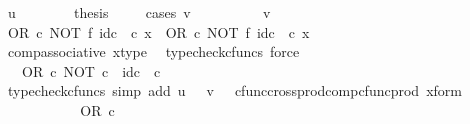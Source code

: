 \begin{isabellebody}
\ {\isachardoublequoteopen}u\ {\isacharequal}{\kern0pt}\ {\isasymt}{\isachardoublequoteclose}\isanewline
\ \ \ \ \isamarkupfalse%
\ {\isacharquery}{\kern0pt}thesis\isanewline
\ \ \ \ \isamarkupfalse%
{\isacharparenleft}{\kern0pt}cases\ {\isachardoublequoteopen}v\ {\isacharequal}{\kern0pt}\ {\isasymt}{\isachardoublequoteclose}{\isacharparenright}{\kern0pt}\isanewline
\ \ \ \ \ \ \isamarkupfalse%
\ {\isachardoublequoteopen}v\ {\isacharequal}{\kern0pt}\ {\isasymt}{\isachardoublequoteclose}\isanewline
\ \ \ \ \ \ \isamarkupfalse%
\ {\isachardoublequoteopen}{\isacharparenleft}{\kern0pt}OR\ {\isasymcirc}\isactrlsub c\ NOT\ {\isasymtimes}\isactrlsub f\ id\isactrlsub c\ {\isasymOmega}{\isacharparenright}{\kern0pt}\ {\isasymcirc}\isactrlsub c\ x\ {\isacharequal}{\kern0pt}\ OR\ {\isasymcirc}\isactrlsub c\ {\isacharparenleft}{\kern0pt}NOT\ {\isasymtimes}\isactrlsub f\ id\isactrlsub c\ {\isasymOmega}{\isacharparenright}{\kern0pt}\ {\isasymcirc}\isactrlsub c\ x{\isachardoublequoteclose}\isanewline
\ \ \ \ \ \ \ \ \isamarkupfalse%
\ comp{\isacharunderscore}{\kern0pt}associative{}\ x{\isacharunderscore}{\kern0pt}type\ \isamarkupfalse%
\ {\isacharparenleft}{\kern0pt}typecheck{\isacharunderscore}{\kern0pt}cfuncs{\isacharcomma}{\kern0pt}\ force{\isacharparenright}{\kern0pt}\isanewline
\ \ \ \ \ \ \isamarkupfalse%
\ \isamarkupfalse%
\ {\isachardoublequoteopen}{\isachardot}{\kern0pt}{\isachardot}{\kern0pt}{\isachardot}{\kern0pt}\ {\isacharequal}{\kern0pt}\ OR\ {\isasymcirc}\isactrlsub c\ {\isasymlangle}NOT\ {\isasymcirc}\isactrlsub c\ {\isasymt}{\isacharcomma}{\kern0pt}\ id\isactrlsub c\ {\isasymOmega}\ {\isasymcirc}\isactrlsub c\ {\isasymt}{\isasymrangle}{\isachardoublequoteclose}\isanewline
\ \ \ \ \ \ \ \ \isamarkupfalse%
\ {\isacharparenleft}{\kern0pt}typecheck{\isacharunderscore}{\kern0pt}cfuncs{\isacharcomma}{\kern0pt}\ simp\ add{\isacharcolon}{\kern0pt}\ {\isacartoucheopen}u\ {\isacharequal}{\kern0pt}\ {\isasymt}{\isacartoucheclose}\ {\isacartoucheopen}v\ {\isacharequal}{\kern0pt}\ {\isasymt}{\isacartoucheclose}\ cfunc{\isacharunderscore}{\kern0pt}cross{\isacharunderscore}{\kern0pt}prod{\isacharunderscore}{\kern0pt}comp{\isacharunderscore}{\kern0pt}cfunc{\isacharunderscore}{\kern0pt}prod\ x{\isacharunderscore}{\kern0pt}form{\isacharparenright}{\kern0pt}\isanewline
\ \ \ \ \ \ \isamarkupfalse%
\ \isamarkupfalse%
\ {\isachardoublequoteopen}{\isachardot}{\kern0pt}{\isachardot}{\kern0pt}{\isachardot}{\kern0pt}\ {\isacharequal}{\kern0pt}\ OR\ {\isasymcirc}\isactrlsub c\ {\isasymlangle}{\isasymf}{\isacharcomma}{\kern0pt}\ {\isasymt}{\isasymrangle}{\isachardoublequoteclose}\isanewline

\end{isabellebody}

